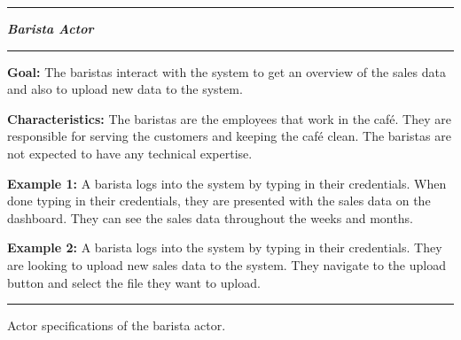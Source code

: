 \begin{table}[H]
    \noindent
    \rule{\textwidth}{0.4pt}

    \begin{center}
    \noindent
    \textit{\textbf{Barista Actor}}
    \end{center}

    \noindent
    \rule{\textwidth}{0.4pt}
    \noindent

    \textbf{Goal:} The baristas interact with the system to get an overview of the sales data and also to upload
    new data to the system.
    \newline
    \noindent

    \textbf{Characteristics:} The baristas are the employees that work in the café.
    They are responsible for serving the customers and keeping the café clean.
    The baristas are not expected to have any technical expertise.
    \newline
    \noindent

    \textbf{Example 1:} A barista logs into the system by typing in their credentials.
    When done typing in their credentials, they are presented with the sales data on the dashboard.
    They can see the sales data throughout the weeks and months.
    \newline
    \noindent

    \textbf{Example 2:} A barista logs into the system by typing in their credentials.
    They are looking to upload new sales data to the system.
    They navigate to the upload button and select the file they want to upload.

    \noindent
    \rule{\textwidth}{0.04pt}
    \caption{Actor specifications of the barista actor.
    }\label{tab:actor-barista}
\end{table}

